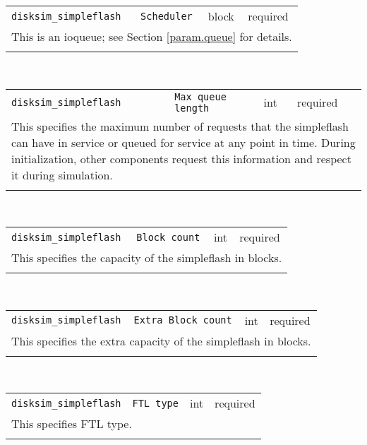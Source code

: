 \noindent 
\begin{tabular}{|p{1.5in}|p{3.5in}|p{0.5in}|p{0.5in}|}
\cline{1-4}
\texttt{disksim\_simpleflash} & \texttt{Scheduler} & block & required \\ 
\cline{1-4}
\multicolumn{4}{|p{6in}|}{
This is an ioqueue; see Section \ref{param.queue} for details.
}\\ 
\cline{1-4}
\multicolumn{4}{p{5in}}{}\\
\end{tabular}\\ 
\noindent 
\begin{tabular}{|p{1.5in}|p{3.5in}|p{0.5in}|p{0.5in}|}
\cline{1-4}
\texttt{disksim\_simpleflash} & \texttt{Max queue length} & int & required \\ 
\cline{1-4}
\multicolumn{4}{|p{6in}|}{
This specifies the maximum number of requests that the simpleflash can have
in service or queued for service at any point in time. During
initialization, other components request this information and respect
it during simulation.
}\\ 
\cline{1-4}
\multicolumn{4}{p{5in}}{}\\
\end{tabular}\\ 
\noindent 
\begin{tabular}{|p{1.5in}|p{3.5in}|p{0.5in}|p{0.5in}|}
\cline{1-4}
\texttt{disksim\_simpleflash} & \texttt{Block count} & int & required \\ 
\cline{1-4}
\multicolumn{4}{|p{6in}|}{
This specifies the capacity of the simpleflash in blocks.
}\\ 
\cline{1-4}
\multicolumn{4}{p{5in}}{}\\
\end{tabular}\\ 
\noindent 
\begin{tabular}{|p{1.5in}|p{3.5in}|p{0.5in}|p{0.5in}|}
\cline{1-4}
\texttt{disksim\_simpleflash} & \texttt{Extra Block count} & int & required \\ 
\cline{1-4}
\multicolumn{4}{|p{6in}|}{
This specifies the extra capacity of the simpleflash in blocks.
}\\ 
\cline{1-4}
\multicolumn{4}{p{5in}}{}\\
\end{tabular}\\ 
\noindent 
\begin{tabular}{|p{1.5in}|p{3.5in}|p{0.5in}|p{0.5in}|}
\cline{1-4}
\texttt{disksim\_simpleflash} & \texttt{FTL type} & int & required \\ 
\cline{1-4}
\multicolumn{4}{|p{6in}|}{
This specifies FTL type.
}\\ 
\cline{1-4}
\multicolumn{4}{p{5in}}{}\\
\end{tabular}\\ 
